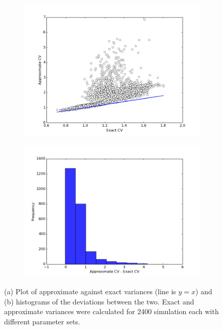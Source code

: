 \documentclass[a4paper,12pt]{article}
\begin{document}
\begin{figure}[!ht]
        \centering
        \begin{subfigure}[!ht]{0.7\textwidth}
                \includegraphics[width=\textwidth]{images/approx_exact_var}
                \caption{}
                \label{fig:approx_exact_var}
        \end{subfigure}%
        
        \begin{subfigure}[b]{0.7\textwidth}
                \includegraphics[width=\textwidth]{images/approx_var_dev}
                \caption{}
                \label{fig:approx_var_dev}
        \end{subfigure}
        
\caption{(a) Plot of approximate against exact variances (line is $y=x$) and (b) histograms of the deviations between the two. Exact and approximate variances were calculated for 2400 simulation each with different parameter sets.}
\label{fig:dev_hists}
\end{figure}
\end{document}
